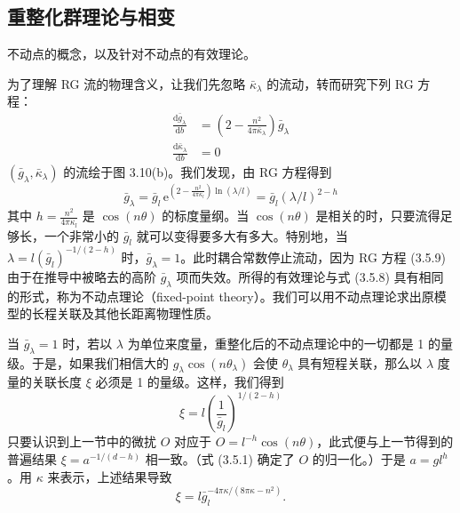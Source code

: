 \subsection{重整化群理论与相变}

\begin{keypoints}
\item 不动点的概念，以及针对不动点的有效理论。
\end{keypoints}

为了理解 RG 流的物理含义，让我们先忽略 $\bar{\kappa}_\lambda$ 的流动，转而研究下列 RG 方程：
\begin{align*}
\frac{\mathrm{d}\bar{g}_\lambda}{\mathrm{d}b} &= \left(2 - \frac{n^2}{4\pi\bar{\kappa}_\lambda}\right)\bar{g}_\lambda \\
\frac{\mathrm{d}\bar{\kappa}_\lambda}{\mathrm{d}b} &= 0\tag{3.5.10}
\end{align*}
$(\bar{g}_\lambda,\bar{\kappa}_\lambda)$ 的流绘于图 3.10(b)。我们发现，由 RG 方程得到
\begin{equation*}
\bar{g}_\lambda = \bar{g}_l\,\mathrm{e}^{\left(2 - \frac{n^2}{4\pi\kappa_l}\right)\ln(\lambda/l)} = \bar{g}_l(\lambda/l)^{2-h}
\end{equation*}
其中 $h = \frac{n^2}{4\pi\kappa_l}$ 是 $\cos(n\theta)$ 的标度量纲。当 $\cos(n\theta)$ 是相关的时，只要流得足够长，一个非常小的 $\bar{g}_l$ 就可以变得要多大有多大。特别地，当 $\lambda = l(\bar{g}_l)^{-1/(2-h)}$ 时，$\bar{g}_\lambda = 1$。此时耦合常数停止流动，因为 RG 方程 (3.5.9) 由于在推导中被略去的高阶 $\bar{g}_\lambda$ 项而失效。所得的有效理论与式 (3.5.8) 具有相同的形式，称为不动点理论（fixed-point theory）。我们可以用不动点理论求出原模型的长程关联及其他长距离物理性质。

当 $\bar{g}_\lambda = 1$ 时，若以 $\lambda$ 为单位来度量，重整化后的不动点理论中的一切都是 1 的量级。于是，如果我们相信大的 $g_\lambda\cos(n\theta_\lambda)$ 会使 $\theta_\lambda$ 具有短程关联，那么以 $\lambda$ 度量的关联长度 $\xi$ 必须是 1 的量级。这样，我们得到
\begin{equation*}
\xi = l\left(\frac{1}{\bar{g}_l}\right)^{1/(2-h)}
\end{equation*}
只要认识到上一节中的微扰 $O$ 对应于 $O = l^{-h}\cos(n\theta)$，此式便与上一节得到的普遍结果 $\xi = a^{-1/(d-h)}$ 相一致。（式 (3.5.1) 确定了 $O$ 的归一化。）于是 $a = gl^h$。用 $\kappa$ 来表示，上述结果导致
\begin{equation*}
\xi = l\bar{g}_l^{-4\pi\kappa/(8\pi\kappa - n^2)}.\tag{3.5.11}
\end{equation*}

